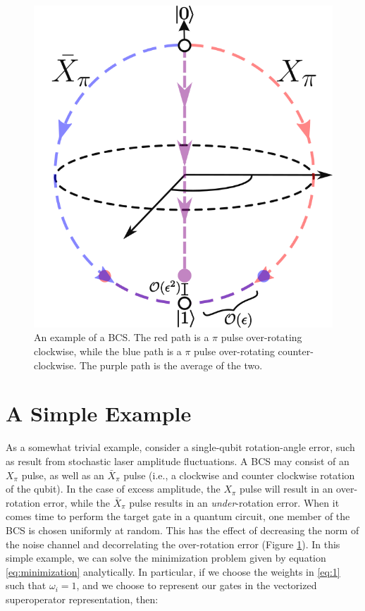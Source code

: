 \documentclass[aps,nofootinbib,pra,notitlepage,twocolumn]{revtex4-1}
\begin{document}
\begin{figure}
  \centering
  \includegraphics[width=.75\columnwidth]{simple_example.png}
  \caption{An example of a BCS. The red path is a $\pi$ pulse over-rotating clockwise, while the blue path is a $\pi$ pulse over-rotating counter-clockwise. The purple path is the average of the two.}
  \label{fig:simple_example}
\end{figure}

\section{A Simple Example}
As a somewhat trivial example, consider a single-qubit rotation-angle error, such as result from stochastic laser amplitude fluctuations. A BCS may consist of an $X_\pi$ pulse, as well as an $\bar X_\pi$ pulse (i.e., a clockwise and counter clockwise rotation of the qubit). In the case of excess amplitude, the $X_\pi$ pulse will result in an over-rotation error, while the $\bar X_\pi$ pulse results in an \emph{under}-rotation error. When it comes time to perform the target gate in a quantum circuit, one member of the BCS is chosen uniformly at random. This has the effect of decreasing the norm of the noise channel and decorrelating the over-rotation error (Figure \ref{fig:simple_example}). In this simple example, we can solve the minimization problem given by equation \ref{eq:minimization} analytically. In particular, if we choose the weights in \ref{eq:1} such that $\omega_i=1$, and we choose to represent our gates in the vectorized superoperator representation, then:
\end{document}
